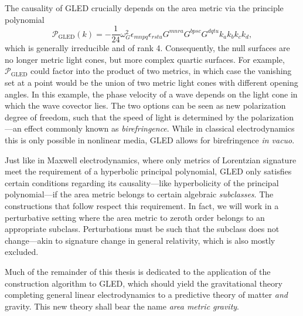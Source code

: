 The causality of GLED crucially depends on the area metric via the principle polynomial \cite{Obukhov_2000}
\begin{equation}\label{gled_polynomial}
  \mathcal P_\text{GLED}(k) = -\frac{1}{24} \omega_G^2 \epsilon_{mnpq} \epsilon_{rstu} G^{mnra} G^{bpsc} G^{dqtu} k_a k_b k_c k_d,
\end{equation}
which is generally irreducible and of rank 4. Consequently, the null surfaces are no longer metric light cones, but more complex quartic surfaces. For example, $\mathcal P_\text{GLED}$ could factor into the product of two metrics, in which case the vanishing set at a point would be the union of two metric light cones with different opening angles. In this example, the phase velocity of a wave depends on the light cone in which the wave covector lies. The two options can be seen as new polarization degree of freedom, such that the speed of light is determined by the polarization---an effect commonly known as \emph{birefringence}. While in classical electrodynamics this is only possible in nonlinear media, GLED allows for birefringence \emph{in vacuo}.

Just like in Maxwell electrodynamics, where only metrics of Lorentzian signature meet the requirement of a hyperbolic principal polynomial, GLED only satisfies certain conditions regarding its causality---like hyperbolicity of the principal polynomial---if the area metric belongs to certain algebraic \emph{subclasses}. \cite{R_tzel_2011,Rivera_2012} The constructions that follow respect this requirement. In fact, we will work in a perturbative setting where the area metric to zeroth order belongs to an appropriate subclass. Perturbations must be such that the subclass does not change---akin to signature change in general relativity, which is also mostly excluded.

Much of the remainder of this thesis is dedicated to the application of the construction algorithm to GLED, which should yield the gravitational theory completing general linear electrodynamics to a predictive theory of matter \emph{and} gravity. This new theory shall bear the name \emph{area metric gravity}.

